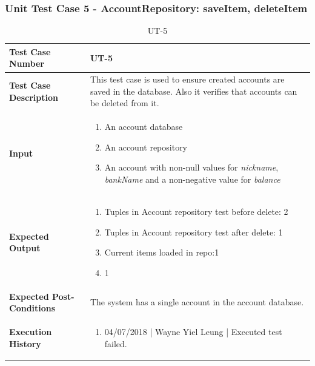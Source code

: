 \documentclass[12pt]{article}
\begin{document}
\subsubsection{Unit Test Case 5 - AccountRepository: saveItem, deleteItem}
\begin{table}[htbp]
\centering
\caption {UT-5}
\label{UT-5}
\begin{tabularx}{\textwidth}{ | l | X |}
\hline
\textbf{Test Case Number}      &  UT-5                     \\ \hline
\textbf{Test Case Description}    &  This test case is used to ensure created accounts are saved in the database. Also it verifies that accounts can be deleted from it.                 \\ \hline
\textbf{Input}         & 	\begin{enumerate}
  
\item An account database
\item An account repository
\item An account with non-null values for \textit{nickname}, \textit{bankName} and a non-negative value for \textit{balance}
  
\end{enumerate} \\ \hline

\textbf{Expected Output}     & \begin{enumerate}
\item Tuples in Account repository test before delete: 2 
\item Tuples in Account repository test after delete: 1 
\item Current items loaded in repo:1 
\item 1

\end{enumerate} \\ \hline
\textbf{Expected Post-Conditions} & The system has a single account in the account database. \\
\hline
\textbf{Execution History}   &  \begin{enumerate}
	\item 04/07/2018 | Wayne Yiel Leung | Executed test failed.
\end {enumerate} \\ \hline
\end{tabularx}
\end{table}
\clearpage

\end{document}
